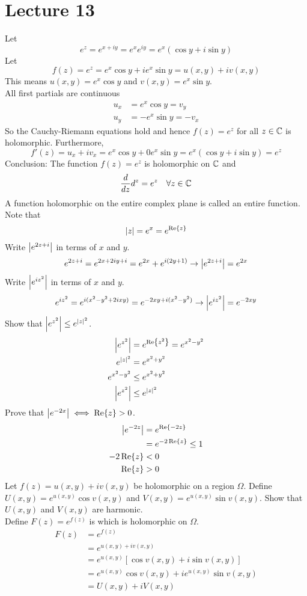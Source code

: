 \documentclass[12pt]{article}
\begin{document}
\section{Lecture 13} 
Let $$e^z = e^{x+iy} = e^xe^{iy} = e^x(\cos y + i\sin y) $$ 
Let $$f(z) = e^z = e^x\cos y + ie^x\sin y = u(x,y) + iv(x,y) $$
This means $u(x,y) = e^x\cos y$ and $v(x,y) = e^x\sin y$. \\
All first partials are continuous $$ \begin{aligned} u_x &= e^x \cos y = v_y \\ u_y &= -e^x\sin y = -v_x \end{aligned} $$ 
So the Cauchy-Riemann equations hold and hence $f(z) = e^z$ for all $z \in\mathbb{C}$ is holomorphic. Furthermore, $$f'(z) = u_x + iv_x = e^x\cos y + 0e^x\sin y = e^x(\cos y + i\sin y) = e^z$$ 
Conclusion: The function $f(z) = e^z$ is holomorphic on $\mathbb{C}$ and $$ \frac{d}{dz} d^z = e^z ~~~ \forall z \in \mathbb{C}$$ 
A function holomorphic on the entire complex plane is called an entire function. \\
Note that $$\abs{z} = e^x = e^{\Re{z}}$$ 
Write $\abs{e^{2z+i}}$ in terms of $x$ and $y$. 
$$ e^{2z+i} = e^{2x + 2iy + i} = e^{2x} + e^{i(2y + 1)} \to \abs{e^{2z+i}} = e^{2x} $$ 
Write $\abs{e^{iz^2}}$ in terms of $x$ and $y$. 
$$ e^{iz^2} = e^{i(x^2 - y^2 + 2ixy)} = e^{-2xy + i(x^2 - y^2)} \to \abs{e^{iz^2}} = e^{-2xy} $$ 
Show that $\abs{e^{z^2}} \leq e^{\abs{z}^2}$. $$ \begin{aligned} \abs{e^{z^2}} &= e^{\Re{z^2}} = e^{x^2 - y^2} \\ e^{\abs{z}^2} &= e^{x^2 + y^2} \\ e^{x^2 - y^2} &\leq e^{x^2 + y^2} \\ \abs{e^{z^2}} &\leq e^{\abs{z}^2} \end{aligned} $$ 
Prove that $\abs{e^{-2x}} \iff \Re{z} > 0$. $$ \begin{aligned} \abs{e^{-2z}} &= e^{\Re{-2z}} \\ &= e^{-2\Re{z}} \leq 1 \\ -2\Re{z} &< 0 \\ \Re{z} &> 0 \end{aligned} $$ 
Let $f(z) = u(x,y) + iv(x,y)$ be holomorphic on a region $\Omega$. Define $U(x,y) = e^{u(x,y)} \cos v(x,y)$ and $V(x,y) = e^{u(x,y)}\sin v(x,y)$. Show that $U(x,y)$ and $V(x,y)$ are harmonic. \\
Define $F(z) = e^{f(z)}$ is which is holomorphic on $\Omega$. $$ \begin{aligned} F(z) &= e^{f(z)} \\ &= e^{u(x,y) + iv(x,y)} \\ &= e^{u(x,y)}[\cos v(x,y) + i\sin v(x,y)] \\ &= e^{u(x,y)}\cos v(x,y) + ie^{u(x,y)} \sin v(x,y) \\ &= U(x,y) + iV(x,y) \end{aligned} $$ 
\end{document}
